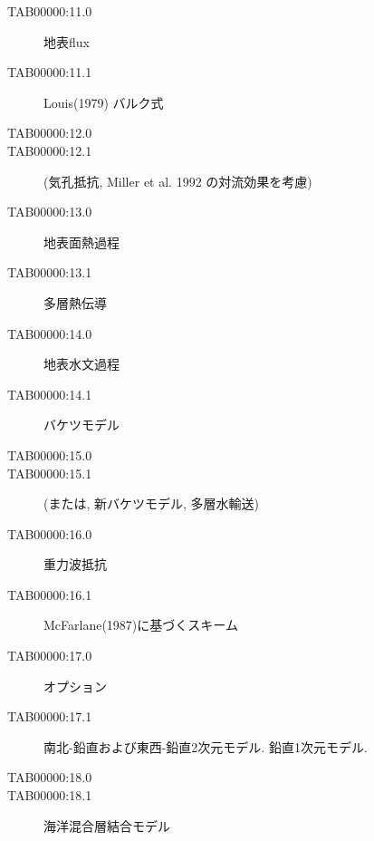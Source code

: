 \begin{center}
\begin{description}
\item[TAB00000:11.0] 地表flux
\item[TAB00000:11.1] Louis(1979) バルク式
\item[TAB00000:12.0] 
\item[TAB00000:12.1] (気孔抵抗, Miller et al. 1992 の対流効果を考慮)
\item[TAB00000:13.0] 地表面熱過程
\item[TAB00000:13.1] 多層熱伝導
\item[TAB00000:14.0] 地表水文過程
\item[TAB00000:14.1] バケツモデル
\item[TAB00000:15.0] 
\item[TAB00000:15.1] (または, 新バケツモデル, 多層水輸送)
\item[TAB00000:16.0] 重力波抵抗
\item[TAB00000:16.1] McFarlane(1987)に基づくスキーム
\item[TAB00000:17.0] オプション
\item[TAB00000:17.1] 南北-鉛直および東西-鉛直2次元モデル. 
                          鉛直1次元モデル.
\item[TAB00000:18.0] 
\item[TAB00000:18.1] 海洋混合層結合モデル
\end{description}
        \end{center}

